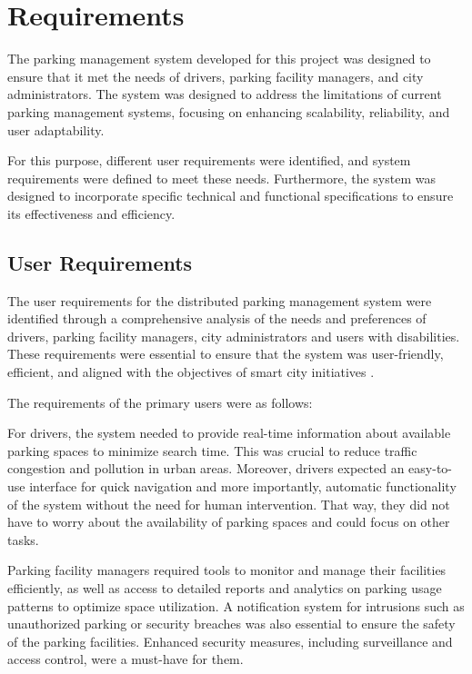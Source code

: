 \documentclass[oneside, 12pt, a4paper, draft]{book}
\begin{document}
\chapter{Requirements}
\label{sec:org285e7c5}
The parking management system developed for this project was designed to ensure that it met the needs of drivers, parking facility managers, and city administrators.
The system was designed to address the limitations of current parking management systems, focusing on enhancing scalability, reliability, and user adaptability.

For this purpose, different user requirements were identified, and system requirements were defined to meet these needs.
Furthermore, the system was designed to incorporate specific technical and functional specifications to ensure its effectiveness and efficiency.
\section{User Requirements}
\label{sec:org5f7294f}
The user requirements for the distributed parking management system were identified through a comprehensive analysis of the needs and preferences of drivers, parking facility managers, city administrators and users with disabilities.
These requirements were essential to ensure that the system was user-friendly, efficient, and aligned with the objectives of smart city initiatives \autocite{smart_cities_initiatives}.

The requirements of the primary users were as follows:

For drivers, the system needed to provide real-time information about available parking spaces to minimize search time.
This was crucial to reduce traffic congestion and pollution in urban areas.
Moreover, drivers expected an easy-to-use interface for quick navigation and more importantly, automatic functionality of the system without the need for human intervention.
That way, they did not have to worry about the availability of parking spaces and could focus on other tasks.

Parking facility managers required tools to monitor and manage their facilities efficiently, as well as access to detailed reports and analytics on parking usage patterns to optimize space utilization.
A notification system for intrusions such as unauthorized parking or security breaches was also essential to ensure the safety of the parking facilities.
Enhanced security measures, including surveillance and access control, were a must-have for them.
\end{document}
